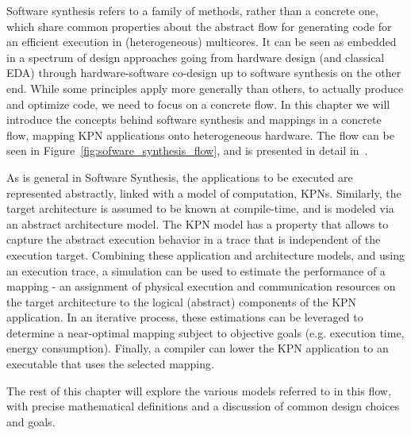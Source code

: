 %

Software synthesis refers to a family of methods, rather than a concrete one, which share common properties about the abstract flow for generating code for an efficient execution in (heterogeneous) multicores.
It can be seen as embedded in a spectrum of design approaches going from hardware design (and classical \ac{EDA}) through hardware-software co-design up to software synthesis on the other end. 
While some principles apply more generally than others, to actually produce and optimize code, we need to focus on a concrete flow.
In this chapter we will introduce the concepts behind software synthesis and mappings in a concrete flow, mapping KPN applications onto heterogeneous hardware.
The flow can be seen in Figure~\ref{fig:sofware_synthesis_flow}, and is presented in detail in~\cite{castrillon2014thesis}. 


As is general in Software Synthesis, the applications to be executed are represented abstractly, linked with a model of computation, \acfp{KPN}.
Similarly, the target architecture is assumed to be known at compile-time, and is modeled via an abstract architecture model.
The \ac{KPN} model has a property that allows to capture the abstract execution behavior in a trace that is independent of the execution target.
Combining these application and architecture models, and using an execution trace, a simulation can be used to estimate the performance of a mapping - an assignment of physical execution and communication resources on the target architecture to the logical (abstract) components of the \ac{KPN} application.
In an iterative process, these estimations can be leveraged to determine a near-optimal mapping subject to objective goals (e.g. execution time, energy consumption).
Finally, a compiler can lower the KPN application to an executable that uses the selected mapping.

The rest of this chapter will explore the various models referred to in this flow, with precise mathematical definitions and a discussion of common design choices and goals.